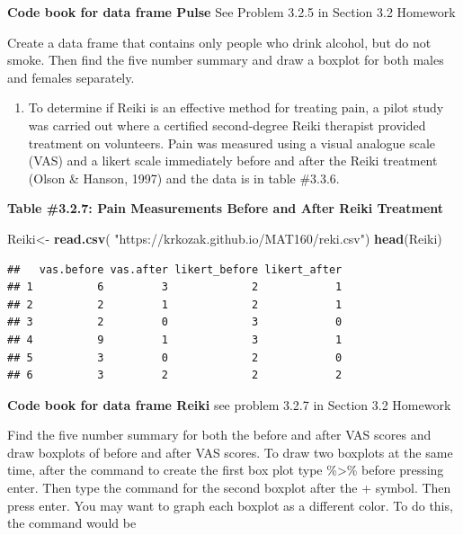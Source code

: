 \documentclass[
]{book}
\newenvironment{Shaded}{\begin{snugshade}}{\end{snugshade}}
\newcommand{\KeywordTok}[1]{\textcolor[rgb]{0.13,0.29,0.53}{\textbf{#1}}}
\newcommand{\NormalTok}[1]{#1}
\newcommand{\StringTok}[1]{\textcolor[rgb]{0.31,0.60,0.02}{#1}}
\providecommand{\tightlist}{%
  \setlength{\itemsep}{0pt}\setlength{\parskip}{0pt}}
\begin{document}
\textbf{Code book for data frame Pulse} See Problem 3.2.5 in Section 3.2 Homework

Create a data frame that contains only people who drink alcohol, but do not smoke. Then find the five number summary and draw a boxplot for both males and females separately.

\begin{enumerate}
\def\labelenumi{\arabic{enumi}.}
\setcounter{enumi}{8}
\tightlist
\item
  To determine if Reiki is an effective method for treating pain, a pilot study was carried out where a certified second-degree Reiki therapist provided treatment on volunteers. Pain was measured using a visual analogue scale (VAS) and a likert scale immediately before and after the Reiki treatment (Olson \& Hanson, 1997) and the data is in table \#3.3.6.
\end{enumerate}

\textbf{Table \#3.2.7: Pain Measurements Before and After Reiki Treatment}

\begin{Shaded}
\begin{Highlighting}[]
\NormalTok{Reiki<-}\StringTok{ }\KeywordTok{read.csv}\NormalTok{(}
  \StringTok{"https://krkozak.github.io/MAT160/reki.csv"}\NormalTok{)}
\KeywordTok{head}\NormalTok{(Reiki)}
\end{Highlighting}
\end{Shaded}

\begin{verbatim}
##   vas.before vas.after likert_before likert_after
## 1          6         3             2            1
## 2          2         1             2            1
## 3          2         0             3            0
## 4          9         1             3            1
## 5          3         0             2            0
## 6          3         2             2            2
\end{verbatim}

\textbf{Code book for data frame Reiki} see problem 3.2.7 in Section 3.2 Homework

Find the five number summary for both the before and after VAS scores and draw boxplots of before and after VAS scores. To draw two boxplots at the same time, after the command to create the first box plot type \%\textgreater\% before pressing enter. Then type the command for the second boxplot after the + symbol. Then press enter. You may want to graph each boxplot as a different color. To do this, the command would be
\end{document}
